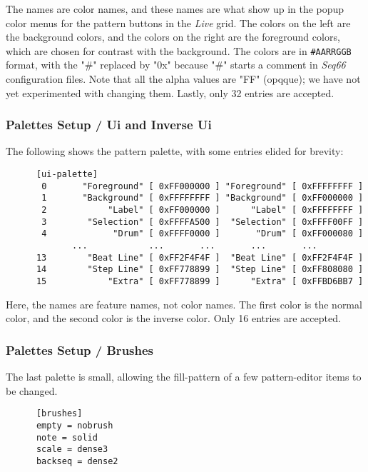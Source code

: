    The names are color names, and these names are what show up in the popup
   color menus for the pattern buttons in the \textsl{Live} grid.
   The colors on the left are the background colors, and the colors on the
   right are the foreground colors, which are chosen for contrast with the
   background.  The colors are in \texttt{\#AARRGGB} format, with the "\#"
   replaced by "0x" because "\#" starts a comment in \textsl{Seq66}
   configuration files.  Note that all the alpha values are "FF" (opqque); we
   have not yet experimented with changing them.
   Lastly, only 32 entries are accepted.

\subsubsection{Palettes Setup / Ui and Inverse Ui}
\label{subsubsec:palettes_setup_ui}

   The following shows the pattern palette, with some entries elided for
   brevity:

   \begin{verbatim}
      [ui-palette]
       0       "Foreground" [ 0xFF000000 ] "Foreground" [ 0xFFFFFFFF ]
       1       "Background" [ 0xFFFFFFFF ] "Background" [ 0xFF000000 ]
       2            "Label" [ 0xFF000000 ]      "Label" [ 0xFFFFFFFF ]
       3        "Selection" [ 0xFFFFA500 ]  "Selection" [ 0xFFFF00FF ]
       4             "Drum" [ 0xFFFF0000 ]       "Drum" [ 0xFF000080 ]
             ...            ...       ...       ...       ...
      13        "Beat Line" [ 0xFF2F4F4F ]  "Beat Line" [ 0xFF2F4F4F ]
      14        "Step Line" [ 0xFF778899 ]  "Step Line" [ 0xFF808080 ]
      15            "Extra" [ 0xFF778899 ]      "Extra" [ 0xFFBD6BB7 ]
   \end{verbatim}

   Here, the names are feature names, not color names.  The first color is the
   normal color, and the second color is the inverse color.  Only 16 entries
   are accepted.

\subsubsection{Palettes Setup / Brushes}
\label{subsubsec:palettes_setup_brushes}

   The last palette is small, allowing the fill-pattern of a few pattern-editor
   items to be changed.

   \begin{verbatim}
      [brushes]
      empty = nobrush
      note = solid
      scale = dense3
      backseq = dense2
   \end{verbatim}

